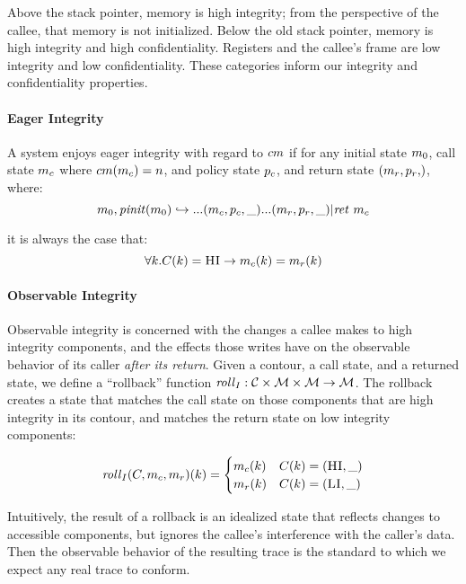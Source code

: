 \documentclass[conference]{IEEEtran}
\begin{document}
      Above the stack pointer, memory is high integrity; from the perspective of the callee, that
      memory is not initialized. Below the old stack pointer, memory is high integrity and high
      confidentiality. Registers and the callee's frame are low integrity and low confidentiality.
      These categories inform our integrity and confidentiality properties.

    \paragraph{Eager Integrity}

      A system enjoys eager integrity with regard to \(cm\) if for any initial state \(m_0\),
      call state \(m_c\) where \(cm(m_c) = n\), and policy state \(p_c\), and
      return state \(\mpstate{\mach_r,\pol_r}\), where:
      \[m_0,\mathit{pinit}(m_0) \hookrightarrow ... (m_c,p_c,\_) ...
        (m_r,p_r,\_) | \mathit{ret}\ m_c\]

      it is always the case that:
      \[\forall k . C(k) = \textsc{HI} \rightarrow m_c(k) = m_r(k)\]

    \paragraph{Observable Integrity}

      Observable integrity is concerned with the changes a callee makes to high integrity components,
      and the effects those writes have on the observable behavior of its caller
      {\it after its return}. Given a contour, a call state, and a returned state, we define
      a ``rollback'' function \(\mathit{roll}_I : {\mathcal C} \times {\mathcal M} \times {\mathcal M}
      \rightarrow {\mathcal M}\). The rollback creates a state that matches the call
      state on those components that are high integrity in its contour, and matches the return state
      on low integrity components:

      \[\mathit{roll}_I(C,m_c,m_r)(k) =
      \begin{cases}
        m_c(k) & C(k) = (\textsc{HI},\_) \\
        m_r(k) & C(k) = (\textsc{LI},\_) \\
      \end{cases}\]

      Intuitively, the result of a rollback is an idealized state that reflects changes to accessible
      components, but ignores the callee's interference with the caller's data. Then the observable
      behavior of the resulting trace is the standard to which we expect any real trace to conform.
\end{document}
